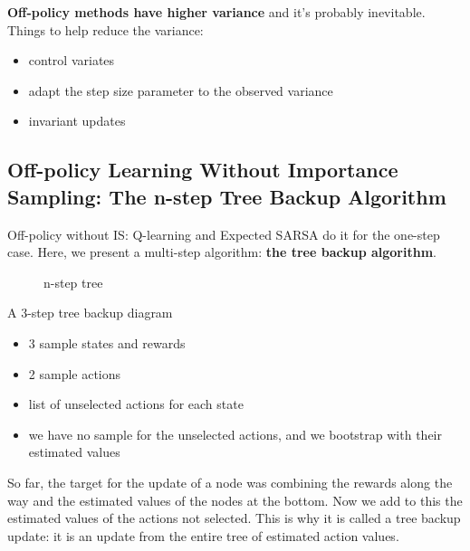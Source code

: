 \documentclass[sutton_barto_notes.tex]{subfiles}
\begin{document}
\textbf{Off-policy methods have higher variance} and it's probably inevitable. Things to help reduce the variance:
\begin{itemize}
\item control variates
\item adapt the step size parameter to the observed variance
\item invariant updates
\end{itemize}

\subsection{Off-policy Learning Without Importance Sampling: The n-step Tree Backup Algorithm}

Off-policy without IS: Q-learning and Expected SARSA do it for the one-step case. Here, we present a multi-step algorithm: \textbf{the tree backup algorithm}.

\begin{figure}[h!]
    \caption{ n-step tree }
\end{figure}
A 3-step tree backup diagram
\begin{itemize}
\item 3 sample states and rewards
\item 2 sample actions
\item list of unselected actions for each state
\item we have no sample for the unselected actions, and we bootstrap with their estimated values
\end{itemize}

So far, the target for the update of a node was combining the rewards along the way and the estimated values of the nodes at the bottom. Now we add to this the estimated values of the actions not selected. This is why it is called a tree backup update: it is an update from the entire tree of estimated action values.
\end{document}

